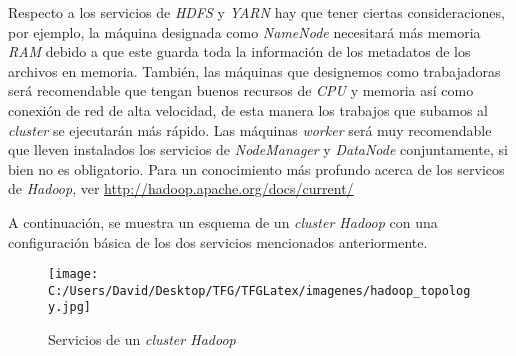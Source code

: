 Respecto a los servicios de \textit{HDFS} y \textit{YARN} hay que tener ciertas consideraciones,
por ejemplo, la máquina designada como \textit{NameNode} necesitará más memoria \textit{RAM} 
debido a que este guarda toda la información de los metadatos de los archivos en memoria. 
También, las máquinas que designemos como trabajadoras será recomendable que tengan buenos recursos 
de \textit{CPU} y memoria así como conexión de red de alta velocidad, de esta manera los trabajos 
que subamos al \textit{cluster} se ejecutarán más rápido.
Las máquinas \textit{worker} será muy recomendable que lleven instalados los servicios de 
\textit{NodeManager} y \textit{DataNode} conjuntamente, si bien no es obligatorio.
Para un conocimiento más profundo acerca de los servicos de \textit{Hadoop}, ver 
\url{http://hadoop.apache.org/docs/current/}
\newline

A continuación, se muestra un esquema de un \textit{cluster Hadoop} con una configuración básica de los dos 
servicios mencionados anteriormente.

\begin{figure}[h]
  \centering
  \texttt{[image: C:/Users/David/Desktop/TFG/TFGLatex/imagenes/hadoop\_topology.jpg]}
  \caption[Servicios de un \textit{cluster Hadoop}]{Servicios de un \textit{cluster Hadoop}}
  \label{hadoop_topology}
\end{figure}

\clearpage